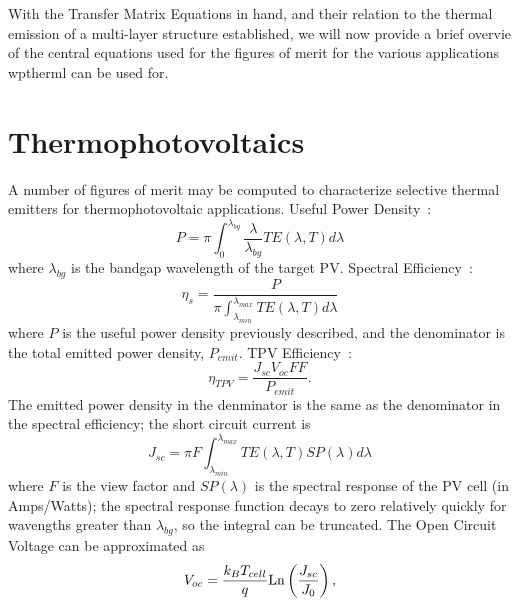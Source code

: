 \documentclass[journal=jpclcd,manuscript=suppinfo]{achemso}
\begin{document}
With the Transfer Matrix Equations in hand, and their relation to the thermal
emission of a multi-layer structure established, we will now provide a brief overvie of the 
central equations used for the figures of merit for the various applications wptherml
can be used for.

\section{Thermophotovoltaics}
A number of figures of merit may be computed to characterize selective thermal emitters
for thermophotovoltaic applications.
\newline
Useful Power Density~\cite{JHR_AdvEnMat_2018}:
\begin{equation}
P = \pi \int_0^{\lambda_{bg}} \frac{\lambda}{\lambda_{bg}} TE(\lambda, T) d\lambda
\end{equation}
where $\lambda_{bg}$ is the bandgap wavelength of the target PV.
\newline
Spectral Efficiency~\cite{JHR_AdvEnMat_2018}:
\begin{equation}
\eta_s = \frac{P}{\pi \int_{\lambda_{min}}^{\lambda_{max}} TE(\lambda, T) d\lambda}
\end{equation}
where $P$ is the useful power density previously described, and the
denominator is the total emitted power density, $P_{emit}$.
\newline
TPV Efficiency~\cite{QHM_Solar_2005, RF_OptExp_2009,JHR_AdvEnMat_2018}:
\begin{equation}
\eta_{TPV} = \frac{ J_{sc} V_{oc} FF}{P_{emit}}.
\end{equation}
The emitted power density in the denminator is the same as the denominator
in the spectral efficiency;  
the short circuit current is~\cite{QHM_Solar_2005, RF_OptExp_2009,JHR_AdvEnMat_2018}
\begin{equation}
J_{sc} = \pi F \int_{\lambda_{min}}^{\lambda_{max}} TE(\lambda, T) SP(\lambda) d\lambda
\end{equation}
where $F$ is the view factor and $SP(\lambda)$ is the spectral response of the PV cell (in Amps/Watts);
the spectral response function decays to zero relatively quickly for wavengths greater than $\lambda_{bg}$, 
so the integral can be truncated. 
The Open Circuit Voltage can be approximated as~\cite{QHM_Solar_2005, JHR_AdvEnMat_2018}
\begin{equation}
V_{oc} = \frac{k_B T_{cell}}{q} {\rm Ln}\left(\frac{J_{sc}}{J_0}\right) ,
\end{equation}
\end{document}
